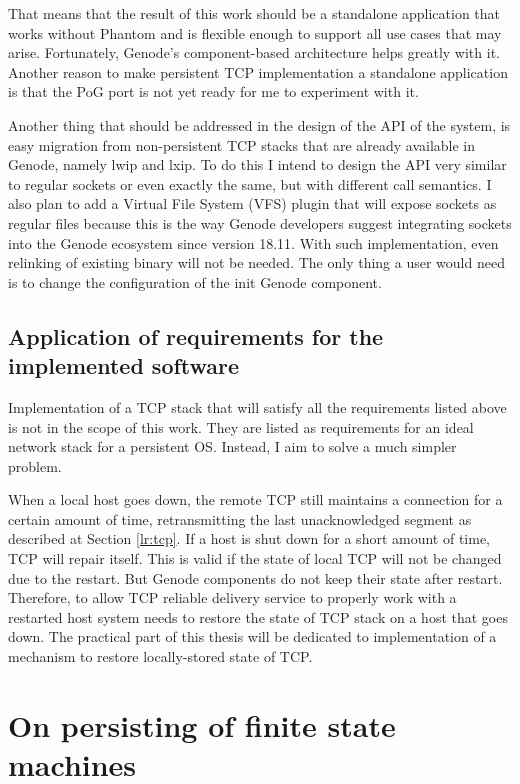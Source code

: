 That means that the result of this work should be a standalone application that
works without Phantom and is flexible enough to support all use cases that may
arise. Fortunately, Genode's component-based architecture helps greatly with
it. Another reason to make persistent TCP implementation a standalone
application is that the PoG port is not yet ready for me to experiment with it.

Another thing that should be addressed in the design of the API of the system,
is easy migration from non-persistent TCP stacks that are already available in
Genode, namely lwip and lxip. To do this I intend to design the API very
similar to regular sockets or even exactly the same, but with different call
semantics. I also plan to add a Virtual File System (VFS) plugin that will
expose sockets as regular files because this is the way Genode developers
suggest integrating sockets into the Genode ecosystem since version 18.11. With
such implementation, even relinking of existing binary will not be needed. The
only thing a user would need is to change the configuration of the init Genode
component.

\subsection{Application of requirements for the implemented software}

Implementation of a TCP stack that will satisfy all the requirements listed
above is not in the scope of this work. They are listed as requirements for an
ideal network stack for a persistent OS. Instead, I aim to solve a much
simpler problem.

When a local host goes down, the remote TCP still maintains a connection for a
certain amount of time, retransmitting the last unacknowledged segment as
described at Section \ref{lr:tcp}. If a host is shut down for a short amount of
time, TCP will repair itself. This is valid if the state of local TCP will not
be changed due to the restart. But Genode components do not keep their state
after restart. Therefore, to allow TCP reliable delivery service to properly
work with a restarted host system needs to restore the state of TCP stack on a
host that goes down. The practical part of this thesis will be dedicated to
implementation of a mechanism to restore locally-stored state of TCP.

\section{On persisting of finite state machines}
\label{sec:meth:fsms}

